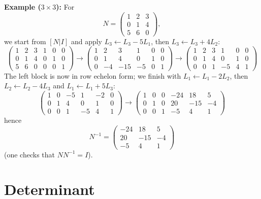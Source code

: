\documentclass[]{article}
\begin{document}
	\noindent \textbf{Example ($3 \times 3$):} For
	$$
	N = \begin{pmatrix} 1 & 2 & 3 \\ 0 & 1 & 4 \\ 5 & 6 & 0 \end{pmatrix},
	$$
	we start from $[N | I]$ and apply $L_3 \leftarrow L_3 - 5L_1$, then $L_3 \leftarrow L_3 + 4L_2$:
	$$
	\left(\begin{array}{ccc|ccc}
		1 & 2 & 3 & 1 & 0 & 0\\
		0 & 1 & 4 & 0 & 1 & 0\\
		5 & 6 & 0 & 0 & 0 & 1
	\end{array}\right)
	\longrightarrow
	\left(\begin{array}{ccc|ccc}
		1 & 2 & 3 & 1 & 0 & 0\\
		0 & 1 & 4 & 0 & 1 & 0\\
		0 & -4 & -15 & -5 & 0 & 1
	\end{array}\right)
	\longrightarrow
	\left(\begin{array}{ccc|ccc}
		1 & 2 & 3 & 1 & 0 & 0\\
		0 & 1 & 4 & 0 & 1 & 0\\
		0 & 0 & 1 & -5 & 4 & 1
	\end{array}\right)
	$$
	The left block is now in row echelon form; we finish with $L_1 \leftarrow L_1 - 2L_2$, then $L_2 \leftarrow L_2 - 4L_3$ and $L_1 \leftarrow L_1 + 5L_3$:
	$$
	\left(\begin{array}{ccc|ccc}
		1 & 0 & -5 & 1 & -2 & 0\\
		0 & 1 & 4 & 0 & 1 & 0\\
		0 & 0 & 1 & -5 & 4 & 1
	\end{array}\right)
	\longrightarrow
	\left(\begin{array}{ccc|ccc}
		1 & 0 & 0 & -24 & 18 & 5\\
		0 & 1 & 0 & 20 & -15 & -4\\
		0 & 0 & 1 & -5 & 4 & 1
	\end{array}\right)
	$$
	hence
	$$
	N^{-1} = \begin{pmatrix} -24 & 18 & 5 \\ 20 & -15 & -4 \\ -5 & 4 & 1 \end{pmatrix}
	$$
	(one checks that $N N^{-1} = I$).
	
	\section{Determinant}
	
\end{document}

